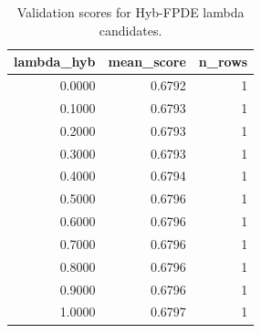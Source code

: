 \begin{table}[t]
\caption{Validation scores for Hyb-FPDE lambda candidates.}
\label{tab:lambda_distribution_computed}
\centering
\begin{tabular}{rrr}
\toprule
lambda\_hyb & mean\_score & n\_rows \\
\midrule
0.0000 & 0.6792 & 1 \\
0.1000 & 0.6793 & 1 \\
0.2000 & 0.6793 & 1 \\
0.3000 & 0.6793 & 1 \\
0.4000 & 0.6794 & 1 \\
0.5000 & 0.6796 & 1 \\
0.6000 & 0.6796 & 1 \\
0.7000 & 0.6796 & 1 \\
0.8000 & 0.6796 & 1 \\
0.9000 & 0.6796 & 1 \\
1.0000 & 0.6797 & 1 \\
\bottomrule
\end{tabular}

\end{table}
